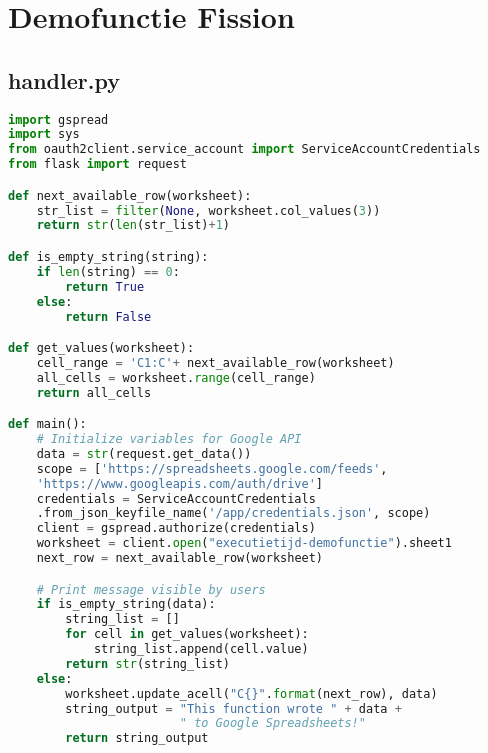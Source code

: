 \newpage
\section{Demofunctie Fission}
\subsection{handler.py}
\label{sec:demofunctie-fission}
\begin{lstlisting}[language=python]
import gspread
import sys
from oauth2client.service_account import ServiceAccountCredentials
from flask import request

def next_available_row(worksheet):
    str_list = filter(None, worksheet.col_values(3))
    return str(len(str_list)+1)

def is_empty_string(string):
    if len(string) == 0:
        return True
    else:
        return False

def get_values(worksheet):
    cell_range = 'C1:C'+ next_available_row(worksheet)
    all_cells = worksheet.range(cell_range)
    return all_cells

def main():   
    # Initialize variables for Google API
    data = str(request.get_data())
    scope = ['https://spreadsheets.google.com/feeds',
    'https://www.googleapis.com/auth/drive']
    credentials = ServiceAccountCredentials
    .from_json_keyfile_name('/app/credentials.json', scope)
    client = gspread.authorize(credentials)
    worksheet = client.open("executietijd-demofunctie").sheet1
    next_row = next_available_row(worksheet)

    # Print message visible by users
    if is_empty_string(data):
        string_list = []
        for cell in get_values(worksheet):
            string_list.append(cell.value)
        return str(string_list)
    else:
        worksheet.update_acell("C{}".format(next_row), data)
        string_output = "This function wrote " + data + 
                        " to Google Spreadsheets!"
        return string_output
\end{lstlisting}